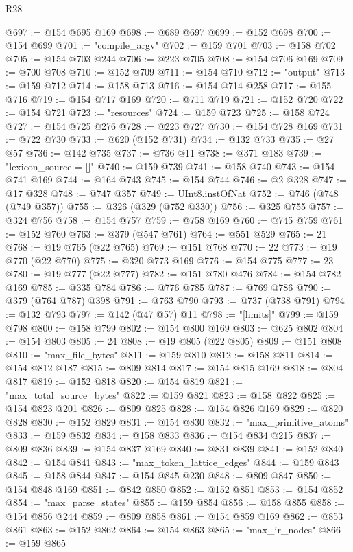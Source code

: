 \begin{lexlean}{R28}
\begin{coremodule}
@697 := @154 @695 @169
@698 := @689 @697
@699 := @152 @698
@700 := @154 @699
@701 := "compile_argv"
@702 := @159 @701
@703 := @158 @702
@705 := @154 @703 @244
@706 := @223 @705
@708 := @154 @706 @169
@709 := @700 @708
@710 := @152 @709
@711 := @154 @710
@712 := "output"
@713 := @159 @712
@714 := @158 @713
@716 := @154 @714 @258
@717 := @155 @716
@719 := @154 @717 @169
@720 := @711 @719
@721 := @152 @720
@722 := @154 @721
@723 := "resources"
@724 := @159 @723
@725 := @158 @724
@727 := @154 @725 @276
@728 := @223 @727
@730 := @154 @728 @169
@731 := @722 @730
@733 := @620 (@152 @731)
@734 := @132 @733
@735 := @27 @57
@736 := @142 @735
@737 := @736 @11
@738 := @371 @183
@739 := "lexicon_source = []"
@740 := @159 @739
@741 := @158 @740
@743 := @154 @741 @169
@744 := @164 @743
@745 := @154 @744
@746 := @2 @328
@747 := @17 @328
@748 := @747 @357
@749 := UInt8.instOfNat
@752 := @746 (@748 (@749 @357))
@755 := @326 (@329 (@752 @330))
@756 := @325 @755
@757 := @324 @756
@758 := @154 @757
@759 := @758 @169
@760 := @745 @759
@761 := @152 @760
@763 := @379 (@547 @761)
@764 := @551 @529
@765 := 21
@768 := @19 @765 (@22 @765)
@769 := @151 @768
@770 := 22
@773 := @19 @770 (@22 @770)
@775 := @320 @773 @169
@776 := @154 @775
@777 := 23
@780 := @19 @777 (@22 @777)
@782 := @151 @780 @476
@784 := @154 @782 @169
@785 := @335 @784
@786 := @776 @785
@787 := @769 @786
@790 := @379 (@764 @787) @398
@791 := @763 @790
@793 := @737 (@738 @791)
@794 := @132 @793
@797 := @142 (@47 @57) @11
@798 := "[limits]"
@799 := @159 @798
@800 := @158 @799
@802 := @154 @800 @169
@803 := @625 @802
@804 := @154 @803
@805 := 24
@808 := @19 @805 (@22 @805)
@809 := @151 @808
@810 := "max_file_bytes"
@811 := @159 @810
@812 := @158 @811
@814 := @154 @812 @187
@815 := @809 @814
@817 := @154 @815 @169
@818 := @804 @817
@819 := @152 @818
@820 := @154 @819
@821 := "max_total_source_bytes"
@822 := @159 @821
@823 := @158 @822
@825 := @154 @823 @201
@826 := @809 @825
@828 := @154 @826 @169
@829 := @820 @828
@830 := @152 @829
@831 := @154 @830
@832 := "max_primitive_atoms"
@833 := @159 @832
@834 := @158 @833
@836 := @154 @834 @215
@837 := @809 @836
@839 := @154 @837 @169
@840 := @831 @839
@841 := @152 @840
@842 := @154 @841
@843 := "max_token_lattice_edges"
@844 := @159 @843
@845 := @158 @844
@847 := @154 @845 @230
@848 := @809 @847
@850 := @154 @848 @169
@851 := @842 @850
@852 := @152 @851
@853 := @154 @852
@854 := "max_parse_states"
@855 := @159 @854
@856 := @158 @855
@858 := @154 @856 @244
@859 := @809 @858
@861 := @154 @859 @169
@862 := @853 @861
@863 := @152 @862
@864 := @154 @863
@865 := "max_ir_nodes"
@866 := @159 @865

\end{coremodule}
\end{lexlean}

